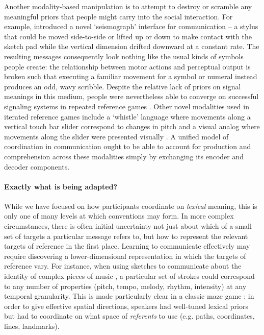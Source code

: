Another modality-based manipulation is to attempt to destroy or scramble any meaningful priors that people might carry into the social interaction.
For example,  introduced a novel `seismograph' interface for communication -- a stylus that could be moved side-to-side or lifted up or down to make contact with the sketch pad while the vertical dimension drifted downward at a constant rate.
The resulting messages consequently look nothing like the usual kinds of symbols people create: the relationship between motor actions and perceptual output is broken such that executing a familiar movement for a symbol or numeral instead produces an odd, wavy scribble.
Despite the relative lack of priors on signal meanings in this medium, people were nevertheless able to converge on successful signaling systems in repeated reference games \cite{RobertsGalantucci12_DualityOfPatterning,RobertsEtAl15_IconocityOnCombinatoriality}.
Other novel modalities used in iterated reference games include a `whistle' language where movements along a vertical touch bar slider correspond to changes in pitch \cite{VerhoefRobertsDingemanse15_Iconicity} and a visual analog where movements along the slider were presented visually \cite{VerhoefEtAl16_TemporalLanguage}.
A unified model of coordination in communication ought to be able to account for production and comprehension across these modalities simply by exchanging its encoder and decoder components.

\paragraph{Exactly what is being adapted?}

While we have focused on how participants coordinate on \emph{lexical} meaning, this is only one of many levels at which conventions may form. 
In more complex circumstances, there is often initial uncertainty not just about which of a small set of targets a particular message refers to, but how to represent the relevant targets of reference in the first place. 
Learning to communicate effectively may require discovering a lower-dimensional representation in which the targets of reference vary.
For instance, when using sketches to communicate about the identity of complex pieces of music \cite{HealeySwobodaUmataKing07_GraphicalLanguageGames}, a particular set of strokes could correspond to any number of properties (pitch, tempo, melody, rhythm, intensity) at any temporal granularity. 
This is made particularly clear in a classic maze game \cite{GarrodAnderson87_SayingWhatYouMean}: in order to give effective spatial directions, speakers had well-tuned lexical priors but had to coordinate on what space of \emph{referents} to use (e.g. paths, coordinates, lines, landmarks). 

